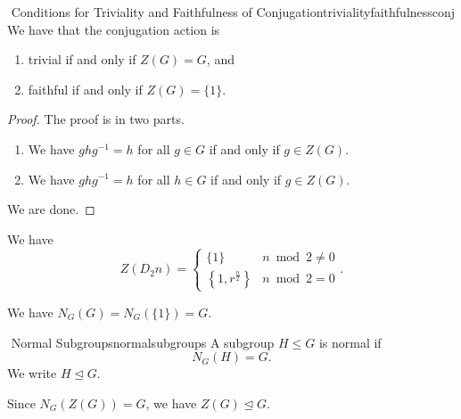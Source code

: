         \pagebreak
        \begin{proposition}{\Stop\,\,Conditions for Triviality and Faithfulness of Conjugation}{trivialityfaithfulnessconj}
            We have that the conjugation action is
            \begin{enumerate}
                \item trivial if and only if \(Z(G)=G\), and
                \item faithful if and only if \(Z(G)=\{1\}\).
            \end{enumerate}
            \begin{proof}
                The proof is in two parts.
                \begin{enumerate}
                    \item We have \(ghg^{-1}=h\) for all \(g\in G\) if and only if \(g\in Z(G)\). 
                    \item We have \(ghg^{-1}=h\) for all \(h\in G\) if and only if \(g\in Z(G)\). 
                \end{enumerate}
                We are done.
            \end{proof}
        \end{proposition}
        \begin{example}
            We have
            \begin{equation*}
                Z(D_2n)=\begin{cases}
                    \{1\} & n\bmod 2\neq0 \\
                    \left\{1,r^\frac{n}{2}\right\} & n\bmod 2=0
                \end{cases}.
            \end{equation*}
        \end{example}
        \begin{example}
            We have \(N_G(G)=N_G(\{1\})=G\).
        \end{example}
        \begin{definition}{\Stop\,\,Normal Subgroups}{normalsubgroups}
            A subgroup \(H\leq G\) is normal if
            \begin{equation*}
                N_G(H)=G.
            \end{equation*}
            We write \(H\trianglelefteq G\).
        \end{definition}
        \begin{example}
            Since \(N_G(Z(G))=G\), we have \(Z(G)\trianglelefteq G\).
        \end{example}

